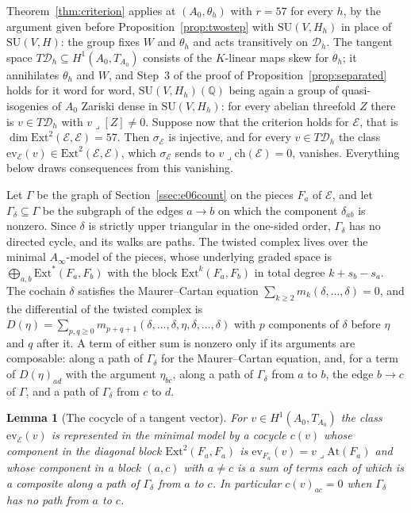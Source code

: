 \documentclass[11pt,reqno]{amsart}
\numberwithin{equation}{section}
\theoremstyle{plain}
\newtheorem{lemma}[theorem]{Lemma}
\theoremstyle{definition}
\newcommand{\QQ}{\mathbb{Q}}
\newcommand{\Ext}{\mathrm{Ext}}
\newcommand{\ch}{\mathrm{ch}}
\newcommand{\SU}{\mathrm{SU}}
\newcommand{\cD}{\mathcal{D}}
\begin{document}
Theorem~\ref{thm:criterion} applies at $(A_{0},\theta_{h})$ with $r=57$ for every $h$, by the argument given before Proposition~\ref{prop:twostep} with $\SU(V,H_{h})$ in place of $\SU(V,H)$: the group fixes $W$ and $\theta_{h}$ and acts transitively on $\cD_{h}$. The tangent space $T\cD_{h}\subseteq H^{1}(A_{0},T_{A_{0}})$ consists of the $K$-linear maps skew for $\theta_{h}$; it annihilates $\theta_{h}$ and $W$, and Step~3 of the proof of Proposition~\ref{prop:separated} holds for it word for word, $\SU(V,H_{h})(\QQ)$ being again a group of quasi-isogenies of $A_{0}$ Zariski dense in $\SU(V,H_{h})$: for every abelian threefold $Z$ there is $v\in T\cD_{h}$ with $v\lrcorner[Z]\ne0$. Suppose now that the criterion holds for $\mathcal{E}$, that is $\dim\Ext^{2}(\mathcal{E},\mathcal{E})=57$. Then $\sigma_{\mathcal{E}}$ is injective, and for every $v\in T\cD_{h}$ the class $\mathrm{ev}_{\mathcal{E}}(v)\in\Ext^{2}(\mathcal{E},\mathcal{E})$, which $\sigma_{\mathcal{E}}$ sends to $v\lrcorner\ch(\mathcal{E})=0$, vanishes. Everything below draws consequences from this vanishing.

Let $\Gamma$ be the graph of Section~\ref{ssec:e06count} on the pieces $F_{a}$ of $\mathcal{E}$, and let $\Gamma_{\delta}\subseteq\Gamma$ be the subgraph of the edges $a\to b$ on which the component $\delta_{ab}$ is nonzero. Since $\delta$ is strictly upper triangular in the one-sided order, $\Gamma_{\delta}$ has no directed cycle, and its walks are paths. The twisted complex lives over the minimal $A_{\infty}$-model of the pieces, whose underlying graded space is $\bigoplus_{a,b}\Ext^{*}(F_{a},F_{b})$ with the block $\Ext^{k}(F_{a},F_{b})$ in total degree $k+s_{b}-s_{a}$. The cochain $\delta$ satisfies the Maurer--Cartan equation $\sum_{k\ge2}m_{k}(\delta,\dots,\delta)=0$, and the differential of the twisted complex is $D(\eta)=\sum_{p,q\ge0}m_{p+q+1}(\delta,\dots,\delta,\eta,\delta,\dots,\delta)$ with $p$ components of $\delta$ before $\eta$ and $q$ after it. A term of either sum is nonzero only if its arguments are composable: along a path of $\Gamma_{\delta}$ for the Maurer--Cartan equation, and, for a term of $D(\eta)_{ad}$ with the argument $\eta_{bc}$, along a path of $\Gamma_{\delta}$ from $a$ to $b$, the edge $b\to c$ of $\Gamma$, and a path of $\Gamma_{\delta}$ from $c$ to $d$.

\begin{lemma}[The cocycle of a tangent vector]\label{lem:cocycle}
For $v\in H^{1}(A_{0},T_{A_{0}})$ the class $\mathrm{ev}_{\mathcal{E}}(v)$ is represented in the minimal model by a cocycle $c(v)$ whose component in the diagonal block $\Ext^{2}(F_{a},F_{a})$ is $\mathrm{ev}_{F_{a}}(v)=v\lrcorner\mathrm{At}(F_{a})$ and whose component in a block $(a,c)$ with $a\ne c$ is a sum of terms each of which is a composite along a path of $\Gamma_{\delta}$ from $a$ to $c$. In particular $c(v)_{ac}=0$ when $\Gamma_{\delta}$ has no path from $a$ to $c$.
\end{lemma}
\end{document}
